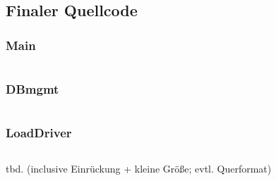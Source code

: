 \documentclass[a4paper, bibliography=totoc, 12pt]{scrartcl}
\begin{document}
\newpage
\subsection{Finaler Quellcode}
\subsubsection*{Main}
\begin{lstlisting}

\end{lstlisting}
\subsubsection*{DBmgmt}
\begin{lstlisting}

\end{lstlisting}
\subsubsection*{LoadDriver}
\begin{lstlisting}

\end{lstlisting}
	tbd. (inclusive Einrückung + kleine Größe; evtl. Querformat)
	
\end{document}
